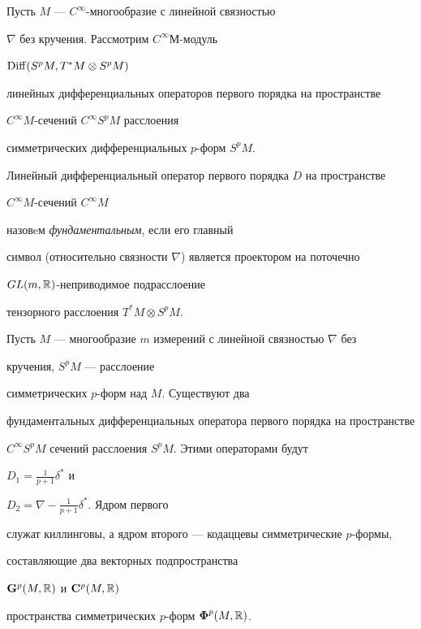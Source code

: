 Пусть $M$ --- $C^\infty$-многообразие с линейной связностью


$\nabla$ без кручения. Рассмотрим $C^\infty М$-модуль


$\operatorname{Diff}(S^pM, T^*M \otimes S^pM)$


линейных дифференциальных операторов первого порядка на пространстве


$C^\infty M$-сечений $C^\infty S^pM$ расслоения 


симметрических дифференциальных $p$-форм $S^pM$.





Линейный дифференциальный оператор первого порядка $D$ на пространстве


$C^\infty M$-сечений $C^\infty M$ 


назовeм {\it фундаментальным}, если его главный


символ (относительно связности $\nabla$) является проектором на поточечно


$GL(m,\Bbb R)$-неприводимое подрасслоение 


тензорного расслоения $T^*M \otimes S^pM$.





\begin{thms}


Пусть $M$ --- многообразие $m$ измерений с линейной связностью $\nabla$ без


кручения, $S^pM$ --- расслоение 


симметрических $p$-форм над $M$. Существуют два


фундаментальных дифференциальных оператора первого порядка на пространстве


$C^\infty S^pM$ сечений расслоения $S^pM$. Этими операторами будут


$D_1=\frac{1}{p+1}\delta^*$ и


$D_2=\nabla-\frac{1}{p+1}\delta^*$. Ядром первого


служат киллинговы, а ядром второго --- кодаццевы симметрические $p$-формы,


составляющие два векторных подпространства


${\bold G}^p(M,\Bbb R)$ и ${\bold C}^p(M,\Bbb R)$


пространства симметрических $p$-форм ${\boldsymbol \Phi}^p(M,\Bbb R)$.


\end{thms}





